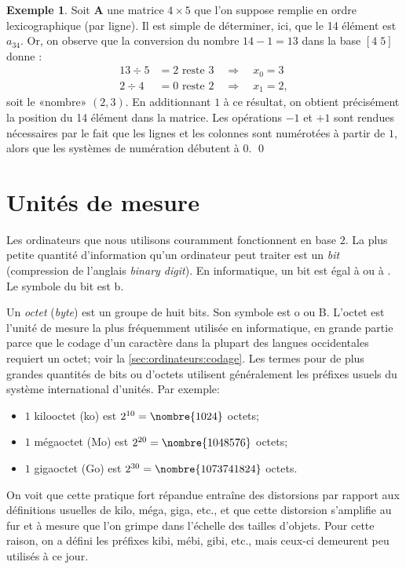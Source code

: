 \documentclass[letterpaper,11pt]{memoir}
\theoremstyle{plain}
\theoremstyle{definition}
\newtheorem{exemple}{Exemple}[chapter]
\theoremstyle{remark}
\begin{document}
\begin{exemple}
  \label{ex:ordinateurs:position_dans_matrice}
  Soit $\mathbf{A}$ une matrice $4 \times 5$ que l'on suppose remplie en
  ordre lexicographique (par ligne). Il est simple de déterminer, ici,
  que le 14{\ieme} élément est $a_{34}$. Or, on observe que la
  conversion du nombre $14 - 1 = 13$ dans la base $[4\; 5]$ donne :
  \begin{align*}
    13 \div 5 &= 2 \text{ reste } 3 \quad\Rightarrow\quad x_0 = 3 \\
     2 \div 4 &= 0 \text{ reste } 2 \quad\Rightarrow\quad x_1 = 2,
   \end{align*}
   soit le «nombre» $(2, 3)$. En additionnant $1$ à ce résultat, on
   obtient précisément la position du 14{\ieme} élément dans la
   matrice. Les opérations $-1$ et $+1$ sont rendues nécessaires par
   le fait que les lignes et les colonnes sont numérotées à partir de
   $1$, alors que les systèmes de numération débutent à $0$.%
   \qed
\end{exemple}



\section{Unités de mesure}
\label{sec:ordinateurs:unites}

Les ordinateurs que nous utilisons couramment fonctionnent en base $2$.
La plus petite quantité d'information qu'un ordinateur peut traiter
est un \emph{bit} (compression de l'anglais \emph{binary digit}). En
informatique, un bit est égal à  ou à . Le symbole du
bit est b.

Un \emph{octet} (\emph{byte}) est un groupe de huit bits. Son symbole
est o ou B. L'octet est l'unité de mesure la plus fréquemment utilisée
en informatique, en grande partie parce que le codage d'un caractère
dans la plupart des langues occidentales requiert un octet; voir la
\autoref{sec:ordinateurs:codage}. Les termes pour de plus grandes
quantités de bits ou d'octets utilisent généralement les préfixes
usuels du système international d'unités. Par exemple:
\begin{itemize}
\item $1$ kilooctet (ko) est $2^{10} = \nombre{1 024}$ octets;
\item $1$ mégaoctet (Mo) est $2^{20} = \nombre{1 048 576}$ octets;
\item $1$ gigaoctet (Go) est $2^{30} = \nombre{1 073 741 824}$ octets.
\end{itemize}
On voit que cette pratique fort répandue entraîne des distorsions par
rapport aux définitions usuelles de kilo, méga, giga, etc., et que
cette distorsion s'amplifie au fur et à mesure que l'on grimpe dans
l'échelle des tailles d'objets. Pour cette raison, on a défini les
préfixes kibi, mébi, gibi, etc., mais ceux-ci demeurent peu utilisés à
ce jour.
\end{document}
